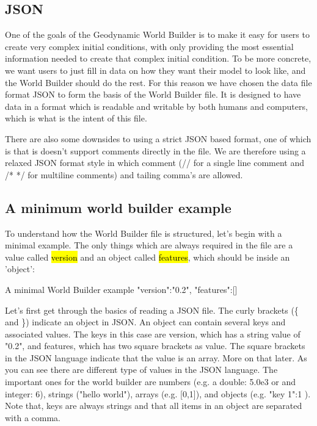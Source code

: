 \documentclass{book}
\newcommand{\GWB}{{Geodynamic World Builder}}
\newcommand{\WB}{{World Builder}}
\begin{document}
\subsection{JSON}
One of the goals of the \GWB{} is to make it easy for users to create very complex initial conditions, with only providing the most essential information needed to create that complex initial condition. To be more concrete, we want users to just fill in data on how they want their model to look like, and the \WB{} should do the rest. For this reason we have chosen the data file format JSON to form the basis of the \WB{} file. It is designed to have data in a format which is readable and writable by both humans and computers, which is what is the intent of this file. 
\begin{remark}
There are also some downsides to using a strict JSON based format, one of which is that is doesn't support comments directly in the file. We are therefore using a relaxed JSON format style in which comment (// for a single line comment and /* */ for multiline comments) and tailing comma's are allowed.
\end{remark}
\subsection{A minimum world builder example}
To understand how the \WB{} file is structured, let's begin with a minimal example. The only things which are always required in the file are a value called \hl{version} and an object called \hl{features}, which should be inside an 'object':

\begin{javascriptcode}{A minimal \WB{} example}{}
{
  "version":"0.2",
  "features":[]
}
\end{javascriptcode}

Let's first get through the basics of reading a JSON file. The curly brackets (\{ and \}) indicate an object in JSON. An object can contain several keys and associated values. The keys in this case are version, which has a string value of "0.2", and features, which has two square brackets as value. The square brackets in the JSON language indicate that the value is an array. More on that later. As you can see there are different type of values in the JSON language. The important ones for the world builder are numbers (e.g. a double: 5.0e3 or and integer: 6), strings ("hello world"), arrays (e.g. [0,1]),  and objects (e.g. { "key 1":1 }). Note that, keys are always strings and that all items in an object are separated with a comma.
\end{document}
